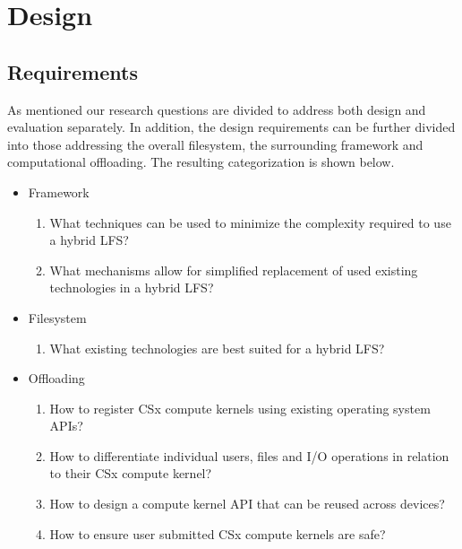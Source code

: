 
\chapter{Design} %



\ifpdf
    \graphicspath{{7/figures/PNG/}{7/figures/PDF/}{7/figures/}}
\else
    \graphicspath{{7/figures/EPS/}{7/figures/}}
\fi


% 

\section{Requirements}

As mentioned our research questions are divided to address both design and
evaluation separately. In addition, the design requirements can be further
divided into those addressing the overall filesystem, the surrounding
framework and computational offloading. The resulting categorization is shown
below.

\begin{itemize}
    \item Framework
    \begin{enumerate}
        \item What techniques can be used to minimize the complexity required to
            use a hybrid LFS?
        \item What mechanisms allow for simplified replacement of used existing
            technologies in a hybrid LFS?
    \end{enumerate}
    \item Filesystem
    \begin{enumerate}
        \item What existing technologies are best suited for a hybrid LFS?
    \end{enumerate}
    \item Offloading
    \begin{enumerate}
        \item How to register CSx compute kernels using existing operating
            system APIs?
        \item How to differentiate individual users, files and I/O operations in
            relation to their CSx compute kernel?
        \item How to design a compute kernel API that can be reused across devices?
        \item How to ensure user submitted CSx compute kernels are safe?
    \end{enumerate}
\end{itemize}

